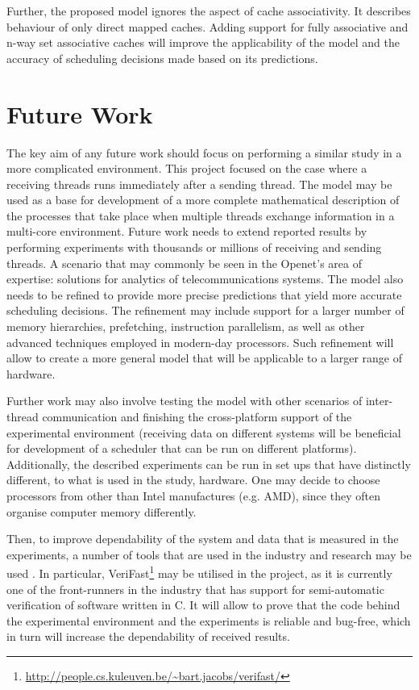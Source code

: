 Further, the proposed model ignores the aspect of cache associativity. It describes behaviour of only direct mapped caches. Adding support for fully associative and n-way set associative caches will improve the applicability of the model and the accuracy of scheduling decisions made based on its predictions.

\section{Future Work}

The key aim of any future work should focus on performing a similar study in a more complicated environment. This project focused on the case where a receiving threads runs immediately after a sending thread. The model may be used as a base for development of a more complete mathematical description of the processes that take place when multiple threads exchange information in a multi-core environment. Future work needs to extend reported results by performing experiments with thousands or millions of receiving and sending threads. A scenario that may commonly be seen in the Openet's area of expertise: solutions for analytics of telecommunications systems. The model also needs to be refined to provide more precise predictions that yield more accurate scheduling decisions. The refinement may include support for a larger number of memory hierarchies, prefetching, instruction parallelism, as well as other advanced techniques employed in modern-day processors. Such refinement will allow to create a more general model that will be applicable to a larger range of hardware.

Further work may also involve testing the model with other scenarios of inter-thread communication and finishing the cross-platform support of the experimental environment (receiving data on different systems will be beneficial for development of a scheduler that can be run on different platforms). Additionally, the described experiments can be run in set ups that have distinctly different, to what is used in the study, hardware. One may decide to choose processors from other than Intel manufactures (e.g. AMD), since they often organise computer memory differently.

Then, to improve dependability of the system and data that is measured in the experiments, a number of tools that are used in the industry and research may be used \cite{Woodcock2009}. In particular, VeriFast\footnote{\url{http://people.cs.kuleuven.be/~bart.jacobs/verifast/}} may be utilised in the project, as it is currently one of the front-runners in the industry \cite{Philippaerts2013} that has support for semi-automatic verification of software written in C. It will allow to prove that the code behind the experimental environment and the experiments is reliable and bug-free, which in turn will increase the dependability of received results.

